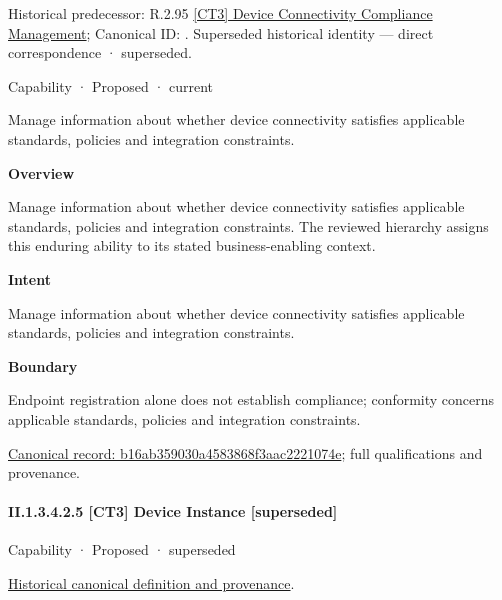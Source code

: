 {\small Historical predecessor: R.2.95 \hyperref[element:9225f083d3474715a75af2a827a4016d]{[CT3] Device Connectivity Compliance Management}; Canonical ID: \texttt{}. Superseded historical identity — direct correspondence · superseded.}\par
\label{element:b16ab359030a4583868f3aac2221074e}
{\small Capability · Proposed · current}\par

Manage information about whether device connectivity satisfies applicable standards, policies and integration constraints.



\textbf{Overview}



Manage information about whether device connectivity satisfies applicable standards, policies and integration constraints. The reviewed hierarchy assigns this enduring ability to its stated business-enabling context.



\textbf{Intent}



Manage information about whether device connectivity satisfies applicable standards, policies and integration constraints.



\textbf{Boundary}



Endpoint registration alone does not establish compliance; conformity concerns applicable standards, policies and integration constraints.


{\footnotesize \href{../../../../../../../continuum/strategy/capability/b16ab359030a4583868f3aac2221074e.md}{Canonical record: b16ab359030a4583868f3aac2221074e}; full qualifications and provenance.}\par
\paragraph*{II.1.3.4.2.5 [CT3] Device Instance [superseded]}
\label{navigation:II.1.3.4.2.5}

\label{element:dd860926038f41e082c56e38cbb5ab95}
{\small Capability · Proposed · superseded}\par
\href{../../../../../../../continuum/strategy/capability/dd860926038f41e082c56e38cbb5ab95.md}{Historical canonical definition and provenance}.\par
